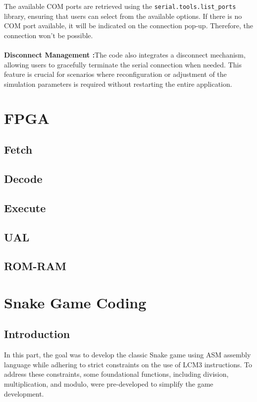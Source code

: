 \documentclass{article}
\begin{document}
The available COM ports are retrieved using the \texttt{serial.tools.list\_ports} library, ensuring that users can select from the available options. If there is no COM port available, it will be indicated on the connection pop-up. Therefore, the connection won't be possible.
\paragraph{}\textbf{Disconnect Management :}The code also integrates a disconnect mechanism, allowing users to gracefully terminate the serial connection when needed. This feature is crucial for scenarios where reconfiguration or adjustment of the simulation parameters is required without restarting the entire application.




\newpage
\section{FPGA}
\subsection{Fetch}
\subsection{Decode}
\subsection{Execute}
\subsection{UAL}
\subsection{ROM-RAM}

\newpage
\section{Snake Game Coding}
\subsection{Introduction}
In this part, the goal was to develop the classic Snake game using ASM assembly language while adhering to strict constraints on the use of LCM3 instructions. To address these constraints, some foundational functions, including division, multiplication, and modulo, were pre-developed to simplify the game development.
\end{document}
